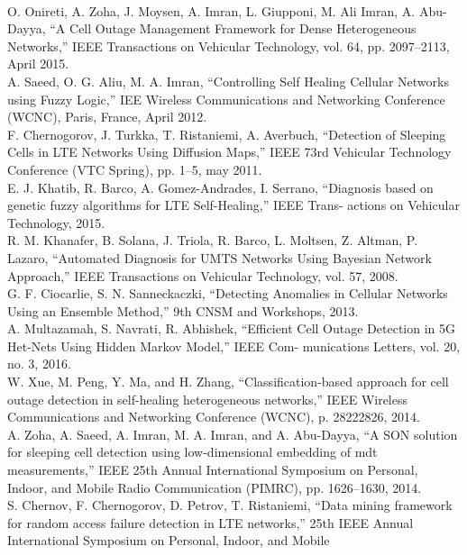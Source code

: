 \documentclass[12pt]{article}
\begin{document}
\begin{multicols}{2}
\\ \noindent [164] O. Onireti, A. Zoha, J. Moysen, A. Imran, L. Giupponi, M. Ali
Imran, A. Abu-Dayya, “A Cell Outage Management Framework for
Dense Heterogeneous Networks,” IEEE Transactions on Vehicular
Technology, vol. 64, pp. 2097–2113, April 2015.
\\ \noindent [165] A. Saeed, O. G. Aliu, M. A. Imran, “Controlling Self Healing Cellular
Networks using Fuzzy Logic,” IEE Wireless Communications and
Networking Conference (WCNC), Paris, France, April 2012.
\\ \noindent [166] F. Chernogorov, J. Turkka, T. Ristaniemi, A. Averbuch, “Detection of
Sleeping Cells in LTE Networks Using Diffusion Maps,” IEEE 73rd
Vehicular Technology Conference (VTC Spring), pp. 1–5, may 2011.
\\ \noindent [167] E. J. Khatib, R. Barco, A. Gomez-Andrades, I. Serrano, “Diagnosis
based on genetic fuzzy algorithms for LTE Self-Healing,” IEEE Trans-
actions on Vehicular Technology, 2015.
\\ \noindent [168] R. M. Khanafer, B. Solana, J. Triola, R. Barco, L. Moltsen, Z. Altman,
P. Lazaro, “Automated Diagnosis for UMTS Networks Using Bayesian
Network Approach,” IEEE Transactions on Vehicular Technology,
vol. 57, 2008.
\\ \noindent [169] G. F. Ciocarlie, S. N. Sanneckaczki, “Detecting Anomalies in Cellular
Networks Using an Ensemble Method,” 9th CNSM and Workshops,
2013.
\\ \noindent [170] A. Multazamah, S. Navrati, R. Abhishek, “Efficient Cell Outage
Detection in 5G Het-Nets Using Hidden Markov Model,” IEEE Com-
munications Letters, vol. 20, no. 3, 2016.
\\ \noindent [171] W. Xue, M. Peng, Y. Ma, and H. Zhang, “Classification-based approach
for cell outage detection in self-healing heterogeneous networks,” IEEE
Wireless Communications and Networking Conference (WCNC), p.
28222826, 2014.
\\ \noindent [172] A. Zoha, A. Saeed, A. Imran, M. A. Imran, and A. Abu-Dayya, “A SON
solution for sleeping cell detection using low-dimensional embedding
of mdt measurements,” IEEE 25th Annual International Symposium
on Personal, Indoor, and Mobile Radio Communication (PIMRC), pp.
1626–1630, 2014.
\\ \noindent [173] S. Chernov, F. Chernogorov, D. Petrov, T. Ristaniemi, “Data mining
framework for random access failure detection in LTE networks,” 25th
IEEE Annual International Symposium on Personal, Indoor, and Mobile

\end{multicols}
\end{document}

